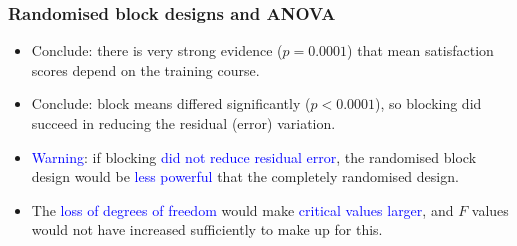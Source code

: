\documentclass[12pt,xcolor=dvipsnames,handout,mathserif,aspectratio=169]{beamer}
\newcommand{\tc}{\textcolor}
\begin{document}
\begin{frame}
\frametitle{Randomised block designs and ANOVA}
\begin{itemize}
\item Conclude: there is very strong evidence ($p = 0.0001$) that mean satisfaction scores depend on the training course.
\vspace{0.2cm}
\item Conclude: block means differed significantly ($p < 0.0001$), so blocking did succeed in reducing the
residual (error) variation.
\vspace*{0.3cm}
\item \tc{blue}{Warning}: if blocking \tc{blue}{did not reduce residual error}, the randomised block design would be \tc{blue}{less powerful} that the completely randomised design.
\vspace*{0.2cm}
\item The \tc{blue}{loss of degrees of freedom} would make \tc{blue}{critical values larger}, and $F$ values would not have increased sufficiently to make up for this.
\end{itemize}
\end{frame}
\end{document}
